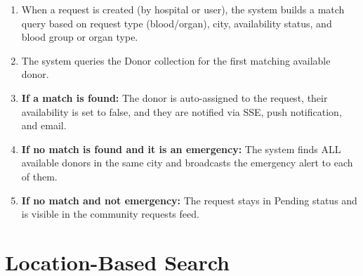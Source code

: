 \documentclass[12pt,a4paper]{article}
\begin{document}
\begin{enumerate}[leftmargin=*]
    \item When a request is created (by hospital or user), the system builds a match query based on request type (blood/organ), city, availability status, and blood group or organ type.
    \item The system queries the Donor collection for the first matching available donor.
    \item \textbf{If a match is found:} The donor is auto-assigned to the request, their availability is set to false, and they are notified via SSE, push notification, and email.
    \item \textbf{If no match is found and it is an emergency:} The system finds ALL available donors in the same city and broadcasts the emergency alert to each of them.
    \item \textbf{If no match and not emergency:} The request stays in Pending status and is visible in the community requests feed.
\end{enumerate}

\section{Location-Based Search}
\end{document}
